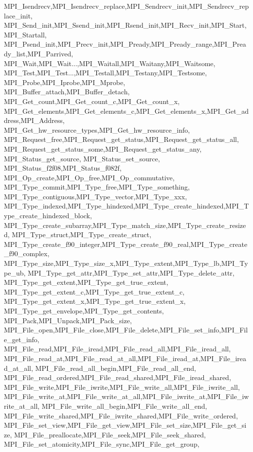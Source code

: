 {{{{{    MPI_Isendrecv,MPI_Isendrecv_replace,MPI_Sendrecv_init,MPI_Sendrecv_replace_init,
    MPI_Send_init,MPI_Ssend_init,MPI_Rsend_init,MPI_Recv_init,MPI_Start,MPI_Startall,
    MPI_Psend_init,MPI_Precv_init,MPI_Pready,MPI_Pready_range,MPI_Pready_list,MPI_Parrived,
    MPI_Wait,MPI_Wait...,MPI_Waitall,MPI_Waitany,MPI_Waitsome,
    MPI_Test,MPI_Test...,MPI_Testall,MPI_Testany,MPI_Testsome,
    MPI_Probe,MPI_Iprobe,MPI_Mprobe,
    MPI_Buffer_attach,MPI_Buffer_detach,
    MPI_Get_count,MPI_Get_count_c,MPI_Get_count_x,
    MPI_Get_elements,MPI_Get_elements_c,MPI_Get_elements_x,MPI_Get_address,MPI_Address,
    MPI_Get_hw_resource_types,MPI_Get_hw_resource_info,
    MPI_Request_free,MPI_Request_get_status,MPI_Request_get_status_all,
    MPI_Request_get_status_some,MPI_Request_get_status_any,
    MPI_Status_get_source, MPI_Status_set_source,
    MPI_Status_f2f08,MPI_Status_f082f,
    MPI_Op_create,MPI_Op_free,MPI_Op_commutative,
    MPI_Type_commit,MPI_Type_free,MPI_Type_something,
    MPI_Type_contiguous,MPI_Type_vector,MPI_Type_xxx,
    MPI_Type_indexed,MPI_Type_hindexed,MPI_Type_create_hindexed,MPI_Type_create_hindexed_block,
    MPI_Type_create_subarray,MPI_Type_match_size,MPI_Type_create_resized,
    MPI_Type_struct,MPI_Type_create_struct,
    MPI_Type_create_f90_integer,MPI_Type_create_f90_real,MPI_Type_create_f90_complex,
    MPI_Type_size,MPI_Type_size_x,MPI_Type_extent,MPI_Type_lb,MPI_Type_ub,
    MPI_Type_get_attr,MPI_Type_set_attr,MPI_Type_delete_attr,
    MPI_Type_get_extent,MPI_Type_get_true_extent,
    MPI_Type_get_extent_c,MPI_Type_get_true_extent_c,
    MPI_Type_get_extent_x,MPI_Type_get_true_extent_x,
    MPI_Type_get_envelope,MPI_Type_get_contents,
    MPI_Pack,MPI_Unpack,MPI_Pack_size,
    MPI_File_open,MPI_File_close,MPI_File_delete,MPI_File_set_info,MPI_File_get_info,
    MPI_File_read,MPI_File_iread,MPI_File_read_all,MPI_File_iread_all,
    MPI_File_read_at,MPI_File_read_at_all,MPI_File_iread_at,MPI_File_iread_at_all,
    MPI_File_read_all_begin,MPI_File_read_all_end,
    MPI_File_read_ordered,MPI_File_read_shared,MPI_File_iread_shared,
    MPI_File_write,MPI_File_iwrite,MPI_File_write_all,MPI_File_iwrite_all,
    MPI_File_write_at,MPI_File_write_at_all,MPI_File_iwrite_at,MPI_File_iwrite_at_all,
    MPI_File_write_all_begin,MPI_File_write_all_end,
    MPI_File_write_shared,MPI_File_iwrite_shared,MPI_File_write_ordered,
    MPI_File_set_view,MPI_File_get_view,MPI_File_set_size,MPI_File_get_size,
    MPI_File_preallocate,MPI_File_seek,MPI_File_seek_shared,
    MPI_File_set_atomicity,MPI_File_sync,MPI_File_get_group,
}}}}}
